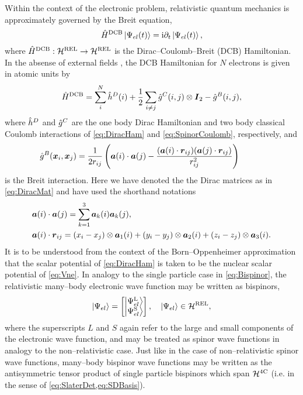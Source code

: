 Within the context of the electronic problem, relativistic quantum mechanics is approximately governed
by the Breit equation,
\begin{equation}
\label{eq:BreitEq}
\hat{H}^{\mathrm{DCB}} \left\vert \Psi_{el} (t) \right\rangle = \mathrm i \partial_t \left\vert \Psi_{el} (t) \right\rangle,
\end{equation}
where $\hat{H}^{\mathrm{DCB}} : \mathcal{H}^{\mathrm{REL}} \rightarrow \mathcal{H}^{\mathrm{REL}}$ is the Dirac--Coulomb--Breit (DCB) Hamiltonian.
In the absense of external fields , the DCB Hamiltonian for $N$ electrons is given in atomic units by 
\begin{equation}
  \label{eq:DCBHam}
  \hat{H}^{\mathrm{DCB}} = \sum_i^N  \hat{h}^D(i) + \frac{1}{2} \sum_{i \neq j}\hat{g}^C(i,j) \otimes \boldsymbol{I}_2 
  - \hat{g}^B(i,j),
\end{equation}
where $\hat{h}^D$ and $\hat{g}^C$ are the one body Dirac Hamiltonian and two body classical Coulomb interactions of \cref{eq:DiracHam} and 
\cref{eq:SpinorCoulomb}, respectively, and
\begin{align}
  &\hat{g}^B(\boldsymbol{x}_i,\boldsymbol{x}_j) = \frac{1}{2r_{ij}} \left( \boldsymbol{a}(i)\cdot\boldsymbol{a}(j) - \frac{(\boldsymbol{a}(i) \cdot \boldsymbol{r}_{ij}) (\boldsymbol{a}(j) \cdot \boldsymbol{r}_{ij})}{r_{ij}^2}\right) 
\qquad  \label{eq:BreitInt}
\end{align}
is the Breit interaction. Here we have denoted the the Dirac matrices as in \cref{eq:DiracMat}
and have used the shorthand notations
\begin{align}
  &\boldsymbol{a}(i) \cdot \boldsymbol{a}(j) = \sum_{k = 1}^3 \boldsymbol{a}_k(i) \boldsymbol{a}_k(j), \\
  &\boldsymbol{a}(i) \cdot \boldsymbol{r}_{ij} = (x_i - x_j) \otimes \boldsymbol{a}_1(i) + (y_i - y_j) \otimes \boldsymbol{a}_2(i) + (z_i - z_j) \otimes \boldsymbol{a}_3(i).
\end{align}
It is to be understood from the context of the Born--Oppenheimer approximation that the scalar potential of \cref{eq:DiracHam}
is taken to be the nuclear scalar potential of \cref{eq:Vne}.
In analogy to the single particle case in \cref{eq:Bispinor}, the relativistic many--body electronic wave function may be 
written as bispinors,
\begin{equation}
  \label{eq:MolBispinor}
  \left\vert \Psi_{el} \right\rangle = 
    \begin{bmatrix}
       \left\vert \Psi_{el}^\mathrm{L} \right\rangle \\
       \left\vert \Psi_{el}^\mathrm{S} \right\rangle 
    \end{bmatrix}, \quad \left\vert \Psi_{el} \right\rangle \in \mathcal{H}^{\mathrm{REL}},
\end{equation}
where the superscripts $L$ and $S$ again refer to the large and small components of the electronic wave function,
and may be treated as spinor wave functions in analogy to the non--relativistic case. Just like in the case of
non--relativistic spinor wave functions, many--body bispinor wave functions may be written as the antisymmetric
tensor product of single particle bispinors which span $\mathcal{H}^{\mathrm{4C}}$ (i.e. in the sense of
\cref{eq:SlaterDet,eq:SDBasis}).

